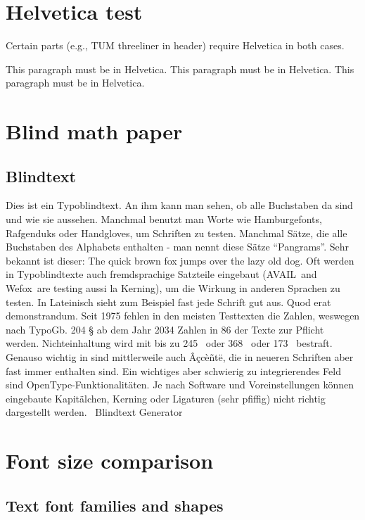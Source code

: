 \documentclass{scrartcl}
\begin{document}
\section{Helvetica test}

Certain parts (e.g., TUM threeliner in header) require Helvetica in both
cases.

\begingroup
{}\selectfont
This paragraph must be in Helvetica. This paragraph must be in Helvetica.
This paragraph must be in Helvetica.
\endgroup

\section{Blind math paper}

\blindmathpaper

\subsection{Blindtext}
Dies ist ein Typoblindtext. An ihm kann man sehen, ob alle Buchstaben da sind
und wie sie aussehen. Manchmal benutzt man Worte wie Hamburgefonts,
Rafgenduks oder Handgloves, um Schriften zu testen. Manchmal Sätze, die alle
Buchstaben des Alphabets enthalten - man nennt diese Sätze
\enquote{Pangrams}. Sehr bekannt ist dieser: The quick brown fox jumps over
the lazy old dog. Oft werden in Typoblindtexte auch fremdsprachige Satzteile
eingebaut (AVAIL\textregistered\ and Wefox\texttrademark\ are testing aussi
la Kerning), um die Wirkung in anderen Sprachen zu testen. In Lateinisch
sieht zum Beispiel fast jede Schrift gut aus. Quod erat demonstrandum. Seit
1975 fehlen in den meisten Testtexten die Zahlen, weswegen nach TypoGb. 204 §
ab dem Jahr 2034 Zahlen in 86 der Texte zur Pflicht werden. Nichteinhaltung
wird mit bis zu 245 \texteuro\ oder 368 \textdollar\ oder 173 \textsterling\
bestraft. Genauso wichtig in sind mittlerweile auch Â\c{c}cè\~{n}t\"{e}, die
in neueren Schriften aber fast immer enthalten sind. Ein wichtiges aber
schwierig zu integrierendes Feld sind OpenType-Funktionalitäten. Je nach
Software und Voreinstellungen können eingebaute Kapitälchen, Kerning oder
Ligaturen (sehr pfiffig) nicht richtig dargestellt werden.
\textcopyright~Blindtext Generator

\section{Font size comparison}

\subsection{Text font families and shapes}
\end{document}
